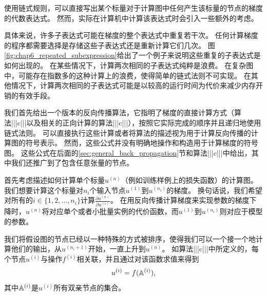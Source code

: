 使用链式规则，可以直接写出某个标量对于计算图中任何产生该标量的节点的梯度的代数表达式。
然而，实际在计算机中计算该表达式时会引入一些额外的考虑。

具体来说，许多子表达式可能在梯度的整个表达式中重复若干次。
任何计算梯度的程序都需要选择是存储这些子表达式还是重新计算它们几次。
图\ref{fig:chap6_repeated_subexpression}给出了一个例子来说明这些重复的子表达式是如何出现的。
在某些情况下，计算两次相同的子表达式纯粹是浪费。
在复杂图中，可能存在指数多的这种计算上的浪费，使得简单的链式法则不可实现。
在其他情况下，计算两次相同的子表达式可能是以较高的运行时间为代价来减少内存开销的有效手段。

我们首先给出一个版本的反向传播算法，它指明了梯度的直接计算方式（算法|||c|||以及相关的正向计算的算法|||c|||），按照它实际完成的顺序并且递归地使用链式法则。
可以直接执行这些计算或者将算法的描述视为用于计算反向传播的计算图的符号表示。
然而，这些公式并没有明确地操作和构造用于计算梯度的符号图。
这些公式在后面的\ref{sec:general_back_propagation}节和算法|||c|||中给出，其中我们还推广到了包含任意张量的节点。

首先考虑描述如何计算单个标量$u^{(n)}$（例如训练样例上的损失函数）的计算图。
我们想要计算这个标量对$n_i$个输入节点$u^{(1)}$到$u^{(n_i)}$的梯度。
换句话说，我们希望对所有的$i\in\{1,2,\ldots,n_i\}$计算$\frac{\partial u^{(n)}}{\partial u^{(i)}}$。
在用反向传播计算梯度来实现参数的梯度下降时，$u^{(n)}$将对应单个或者小批量实例的代价函数，而$u^{(1)}$到$u^{(n_i)}$则对应于模型的参数。


我们将假设图的节点已经以一种特殊的方式被排序，使得我们可以一个接一个地计算他们的输出，从$u^{(n_i+1)}$开始，一直上升到$u^{(n)}$。
如算法|||c|||中所定义的，每个节点$u^{(i)}$与操作$f^{(i)}$相关联，并且通过对该函数求值来得到
\begin{equation}
  u^{(i)} = f(\mathbb{A}^{(i)}),
\end{equation}
其中$\mathbb{A}^{(i)}$是$u^{(i)}$所有双亲节点的集合。


